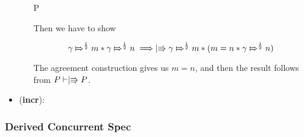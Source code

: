 \begin{itemize}
\begin{itemize}
\infrule
  {\vdash P \implies {}}
  {\vdash {}}
  
Then we have to show

\[
\apointsto{\gamma}{m}{\frac{1}{2}} * \apointsto{\gamma}{n}{\frac{1}{2}} \implies \upmod{ \apointsto{\gamma}{m}{\frac{1}{2}} * (m = n * \apointsto{\gamma}{n}{\frac{1}{2}})}
\]

The agreement construction gives us $m = n$, and then the result follows from $P \vdash \upmod{P}$.

\end{itemize}

\item (\textbf{incr}):
\end{itemize}

\subsubsection{Derived Concurrent Spec}